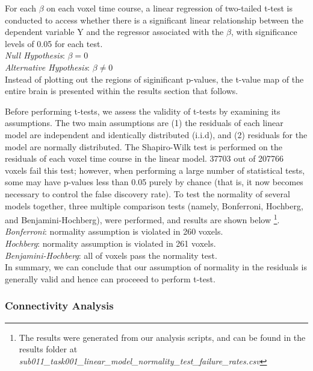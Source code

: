 \documentclass[11pt]{article}
\begin{document}
For each $\beta$ on each voxel time course, a linear regression of two-tailed
t-test is conducted to access whether there is a significant linear relationship
between the dependent variable Y and the regressor associated with the $\beta$,
with significance levels of 0.05 for each test. \\
 
\textit{Null Hypothesis}: $ \beta = 0$ \\

\textit{Alternative Hypothesis}: $\beta \neq 0$ \\

Instead of plotting out the regions of siginificant p-values, the t-value map of
the entire brain is presented within the results section that follows. 

Before performing t-tests, we assess the validity of t-tests by examining its
assumptions. The two main assumptions are (1) the residuals of each linear model
are independent and identically distributed (i.i.d), and (2) residuals for the model
are normally distributed. The Shapiro-Wilk test is performed on the residuals of
each voxel time course in the linear model. 37703 out of 207766 voxels fail this
test; however, when performing a large number of statistical tests, some may have
p-values less than 0.05 purely by chance (that is, it now becomes necessary to control the false discovery rate). To test the normality of several models together, three multiple comparison tests (namely, Bonferroni, Hochberg, and Benjamini-Hochberg), were performed, and results are shown below \footnote{The results were generated from our analysis scripts, and can be found in the results folder at \textit{sub011\_task001\_linear\_model\_normality\_test\_failure\_rates.csv}}. \\

\textit{Bonferroni}: normality assumption is violated in 260 voxels. \\

\textit{Hochberg}: normality assumption is violated in 261 voxels. \\

\textit{Benjamini-Hochberg}: all of voxels pass the normality test. \\

In summary, we can conclude that our assumption of normality in the residuals is
generally valid and hence can proceeed to perform t-test.

\subsubsection{Connectivity Analysis}
\end{document}
